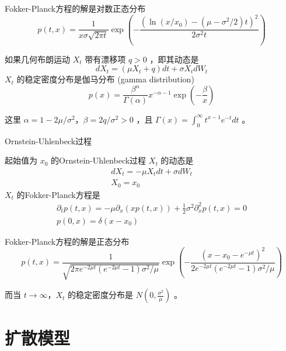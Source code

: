 \documentclass[lang=cn,newtx,10pt,scheme=chinese]{elegantbook}
\begin{document}
Fokker-Planck方程的解是对数正态分布
$$
p(t, x)=\frac{1}{x \sigma \sqrt{2 \pi t}} \exp \left(-\frac{\left(\ln \left(x / x_0\right)-\left(\mu-\sigma^2 / 2\right) t\right)^2}{2 \sigma^2 t}\right)
$$

如果几何布朗运动 $X_t$ 带有漂移项 $q>0$ ，即其动态是
$$
d X_t=\left(\mu X_t+q\right) d t+\sigma X_t d W_t
$$
$X_t$ 的稳定密度分布是伽马分布 (gamma distribution)
$$
p(x)=\frac{\beta^\alpha}{\Gamma(\alpha)} x^{-\alpha-1} \exp \left(-\frac{\beta}{x}\right)
$$

这里 $\alpha=1-2 \mu / \sigma^2 ， \beta=2 q / \sigma^2>0$ ，且 $\Gamma(x)=\int_0^{\infty} t^{x-1} e^{-t} d t$ 。

Ornstein-Uhlenbeck过程

起始值为 $x_0$ 的Ornstein-Uhlenbeck过程 $X_t$ 的动态是
$$
\begin{gathered}
d X_t=-\mu X_t d t+\sigma d W_t \\
X_0=x_0
\end{gathered}
$$
$X_t$ 的Fokker-Planck方程是
$$
\begin{gathered}
\partial_t p(t, x)=-\mu \partial_x(x p(t, x))+\frac{1}{2} \sigma^2 \partial_x^2 p(t, x)=0 \\
p(0, x)=\delta\left(x-x_0\right)
\end{gathered}
$$

Fokker-Planck方程的解是正态分布
$$
p(t, x)=\frac{1}{\sqrt{2 \pi e^{-2 \mu t}\left(e^{-2 \mu t}-1\right) \sigma^2 / \mu}} 
\exp \left(-\frac{\left(x-x_0-e^{-\mu t}\right)^2}{2 e^{-2 \mu t}\left(e^{-2 \mu t}-1\right) \sigma^2 / \mu}\right)
$$

而当 $t \rightarrow \infty ， X_t$ 的稳定密度分布是 $N\left(0, \frac{\sigma^2}{\mu}\right)$ 。





\chapter{扩散模型}
\end{document}
